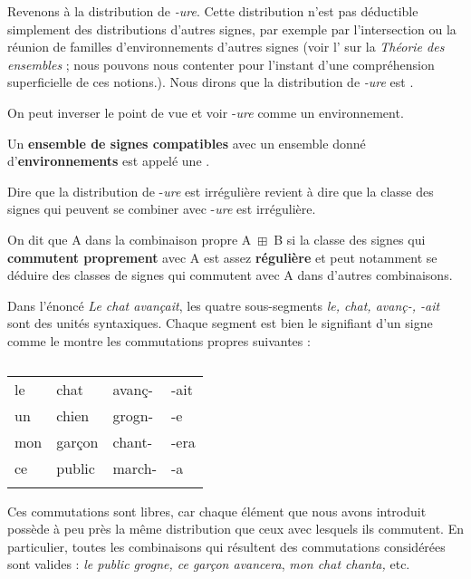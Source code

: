 Revenons à la distribution de \textit{{}-ure}. Cette distribution n’est pas déductible simplement des distributions d’autres signes, par exemple par l’intersection ou la réunion de familles d’environnements d’autres signes (voir l’ sur la \textit{Théorie des ensembles} ; nous pouvons nous contenter pour l’instant d’une compréhension superficielle de ces notions.). Nous dirons que la distribution de  \textit{{}-ure} est .

On peut inverser le point de vue et voir -\textit{ure} comme un environnement.

\begin{styleLivreImportant}
Un \textbf{ensemble de signes compatibles} avec un ensemble donné d’\textbf{environnements} est appelé une .
\end{styleLivreImportant}

Dire que la distribution de -\textit{ure} est irrégulière revient à dire que la classe des signes qui peuvent se combiner avec -\textit{ure} est irrégulière.

\begin{styleLivreImportant}
On dit que A  dans la combinaison propre A~${\boxplus}$~B si la classe des signes qui \textbf{commutent proprement} avec A est assez \textbf{régulière} et peut notamment se déduire des classes de signes qui commutent avec A dans d’autres combinaisons.
\end{styleLivreImportant}

Dans l’énoncé \textit{Le chat avançait}, les quatre sous-segments \textit{le, chat, avanç-, -ait} sont des unités syntaxiques. Chaque segment est bien le signifiant d’un signe comme le montre les commutations propres suivantes :

\begin{table}
\caption{\label{tab:}}
\begin{tabularx}{\textwidth}{XXXX}
\lsptoprule
{ le} & { chat} & { avanç-} & { {}-ait}\\
{ un} & { chien} & { grogn-} & { {}-e}\\
{ mon} & { garçon} & { chant-} & { {}-era}\\
{ ce} & { public} & { march-} & { {}-a}\\
\lspbottomrule
\end{tabularx}
\end{table}

Ces commutations sont libres, car chaque élément que nous avons introduit possède à peu près la même distribution que ceux avec lesquels ils commutent. En particulier, toutes les combinaisons qui résultent des commutations considérées sont valides : \textit{le public grogne, ce garçon avancera}, \textit{mon chat chanta,} etc.

